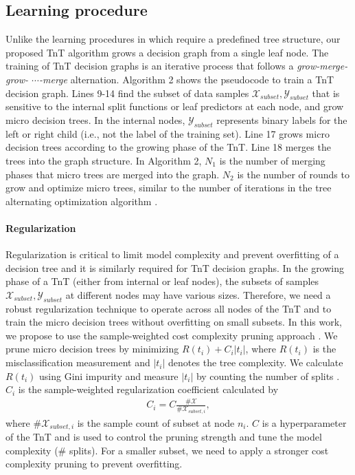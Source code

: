 \documentclass{article}
\begin{document}
\subsection{Learning procedure} \vspace{-2mm}
Unlike the learning procedures in \cite{carreira2018alternating, zharmagambetov2020smaller} which require a predefined tree structure, our proposed TnT algorithm grows a decision graph from a single leaf node. The training of TnT decision graphs is an iterative process that follows a \textit{grow-merge-grow- $\cdots$-merge} alternation. Algorithm 2 shows the pseudocode to train a TnT decision graph. Lines 9-14 find the subset of data samples $\mathcal{X}_{subset},\mathcal{Y}_{subset}$ that is sensitive to the internal split functions or leaf predictors at each node, and grow micro decision trees. In the internal nodes, $\mathcal{Y}_{subset}$ represents binary labels for the left or right child (i.e., not the label of the training set). Line 17 grows micro decision trees according to the growing phase of the TnT. Line 18 merges the trees into the graph structure. In Algorithm 2, $N_1$ is the number of merging phases that micro trees are merged into the graph. $N_2$ is the number of rounds to grow and optimize micro trees, similar to the number of iterations in the tree alternating optimization algorithm \cite{carreira2018alternating, zharmagambetov2020smaller}.

\vspace{-2mm}
\paragraph{Regularization} Regularization is critical to limit model complexity and prevent overfitting of a decision tree and it is similarly required for TnT decision graphs. In the growing phase of a TnT (either from internal or leaf nodes), the subsets of samples $\mathcal{X}_{subset},\mathcal{Y}_{subset}$ at different nodes may have various sizes. Therefore, we need a robust regularization technique to operate across all nodes of the TnT and to train the micro decision trees without overfitting on small subsets. In this work, we propose to use the sample-weighted cost complexity pruning approach \cite{bradford1998pruning, kiran2017cost}. We prune micro decision trees by minimizing $R(t_i)+C_i|t_i|$, where $R(t_i)$ is the misclassification measurement and $|t_i|$ denotes the tree complexity. We calculate $R(t_i)$ using Gini impurity and measure $|t_i|$ by counting the number of splits \cite{steinberg2009cart}. $C_i$ is the sample-weighted regularization coefficient calculated by 
\begin{gather}
\label{eq5}
    C_i = C \frac{\#\mathcal{X}}{\#\mathcal{X}_{subset,i}},
\end{gather}
where $\#\mathcal{X}_{subset,i}$ is the sample count of subset at node $n_i$. $C$ is a hyperparameter of the TnT and is used to control the pruning strength and tune the model complexity ($\#$ splits). For a smaller subset, we need to apply a stronger cost complexity pruning to prevent overfitting.
\end{document}
